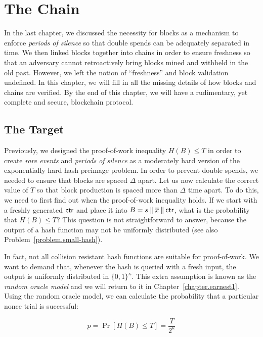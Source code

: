 \chapter{The Chain}\label{chapter.chain}

In the last chapter, we discussed the necessity for blocks as a mechanism to enforce \emph{periods of silence} so that double spends
can be adequately separated in time.  We then linked blocks together into chains in order to ensure freshness so that an adversary cannot
retroactively bring blocks mined and withheld in the old past. However, we left the notion of ``freshness'' and block validation
undefined. In this chapter, we will fill in all the missing details of how blocks and chains are verified. By the end of this chapter,
we will have a rudimentary, yet complete and secure, blockchain protocol.

\section{The Target}

Previously, we designed the proof-of-work inequality $H(B) \leq T$ in order to create \emph{rare events} and \emph{periods of silence}
as a moderately hard version of the exponentially hard hash preimage problem. In order to prevent double spends, we needed to ensure
that blocks are spaced $\Delta$ apart. Let us now calculate the correct value of $T$ so that block production is spaced more than
$\Delta$ time apart. To do this, we need to first find out when the proof-of-work inequality holds. If we start
with a freshly generated $\mathsf{ctr}$ and place it into $B = s \mathbin{\|} \overline{x} \mathbin{\|} \mathsf{ctr}$, what is the probability that $H(B) \leq T$?
This question is not straightforward to answer, because the output of a hash function may not be uniformly distributed (see also
Problem~\ref{problem.small-hash}).

In fact, not all collision resistant hash functions are suitable for proof-of-work. We want to demand that, whenever the hash is queried with a fresh input, the output is uniformly distributed in $\{0,1\}^\kappa$. This extra assumption is known as the \emph{random oracle model} and we will return to it in Chapter~\ref{chapter.earnest1}. Using the random oracle model, we can calculate the probability that a particular nonce trial is successful:

\[
  p = \Pr[H(B) \leq T] = \frac{T}{2^\kappa}
\]

